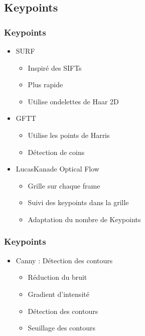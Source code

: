 \subsection{Keypoints}
\begin{frame}
  \frametitle{Keypoints}
  
  \begin{itemize}
  \item SURF
  	\begin{itemize}
  	\item Inspiré des SIFTs
  	\item Plus rapide
  	\item Utilise ondelettes de Haar 2D
  	\end{itemize}
  	
  \item GFTT
    \begin{itemize}
    \item Utilise les points de Harris
    \item Détection de coins
    \end{itemize}
  	
  \item LucasKanade Optical Flow
    \begin{itemize}
    \item Grille sur chaque frame
    \item Suivi des keypoints dans la grille
    \item Adaptation du nombre de Keypoints
    \end{itemize}
  \end{itemize}
\end{frame}  	
  
\begin{frame}
  \frametitle{Keypoints}
  
  \begin{itemize}
  \item Canny : Détection des contours
    \begin{itemize}
  	\item Réduction du bruit
  	\item Gradient d'intensité
  	\item Détection des contours
  	\item Seuillage des contours
  	\end{itemize}
  	
  \end{itemize}


\end{frame}



